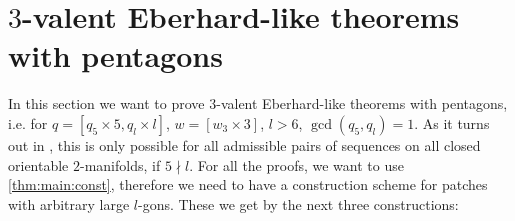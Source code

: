 \section{$3$-valent {\sc Eberhard}-like theorems with pentagons}\label{sec:5:3}

In this section we want to prove $3$-valent {\sc Eberhard}-like theorems with pentagons, i.e. for $q = [q_5 \times 5, q_l \times l]$, $w = [w_3 \times 3]$, $l > 6$, $\gcd(q_5, q_l) = 1$. As it turns out in \label{sec:negative:results}, this is only possible for all admissible pairs of sequences on all closed orientable $2$-manifolds, if $5 \nmid l$. For all the proofs, we want to use \autoref{thm:main:const}, therefore we need to have a construction scheme for patches with arbitrary large $l$-gons. These we get by the next three constructions:

